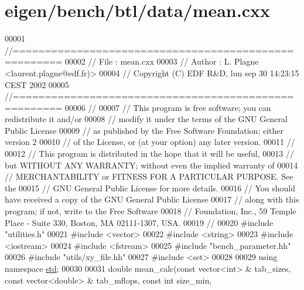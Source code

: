 \hypertarget{eigen_2bench_2btl_2data_2mean_8cxx_source}{}\section{eigen/bench/btl/data/mean.cxx}
\label{eigen_2bench_2btl_2data_2mean_8cxx_source}

\begin{DoxyCode}
00001 \textcolor{comment}{//=====================================================}
00002 \textcolor{comment}{// File   :  mean.cxx}
00003 \textcolor{comment}{// Author :  L. Plagne <laurent.plagne@edf.fr)>        }
00004 \textcolor{comment}{// Copyright (C) EDF R&D,  lun sep 30 14:23:15 CEST 2002}
00005 \textcolor{comment}{//=====================================================}
00006 \textcolor{comment}{// }
00007 \textcolor{comment}{// This program is free software; you can redistribute it and/or}
00008 \textcolor{comment}{// modify it under the terms of the GNU General Public License}
00009 \textcolor{comment}{// as published by the Free Software Foundation; either version 2}
00010 \textcolor{comment}{// of the License, or (at your option) any later version.}
00011 \textcolor{comment}{// }
00012 \textcolor{comment}{// This program is distributed in the hope that it will be useful,}
00013 \textcolor{comment}{// but WITHOUT ANY WARRANTY; without even the implied warranty of}
00014 \textcolor{comment}{// MERCHANTABILITY or FITNESS FOR A PARTICULAR PURPOSE.  See the}
00015 \textcolor{comment}{// GNU General Public License for more details.}
00016 \textcolor{comment}{// You should have received a copy of the GNU General Public License}
00017 \textcolor{comment}{// along with this program; if not, write to the Free Software}
00018 \textcolor{comment}{// Foundation, Inc., 59 Temple Place - Suite 330, Boston, MA  02111-1307, USA.}
00019 \textcolor{comment}{// }
00020 \textcolor{preprocessor}{#include "utilities.h"}
00021 \textcolor{preprocessor}{#include <vector>}
00022 \textcolor{preprocessor}{#include <string>}
00023 \textcolor{preprocessor}{#include <iostream>}
00024 \textcolor{preprocessor}{#include <fstream>}
00025 \textcolor{preprocessor}{#include "bench\_parameter.hh"}
00026 \textcolor{preprocessor}{#include "utils/xy\_file.hh"}
00027 \textcolor{preprocessor}{#include <set>}
00028 
00029 \textcolor{keyword}{using namespace }\hyperlink{namespacestd}{std};
00030 
00031 \textcolor{keywordtype}{double} mean\_calc(\textcolor{keyword}{const} vector<int> & tab\_sizes, \textcolor{keyword}{const} vector<double> & tab\_mflops, \textcolor{keyword}{const} \textcolor{keywordtype}{int} size\_min, \textcolor{keyword}{
}
\end{DoxyCode}
